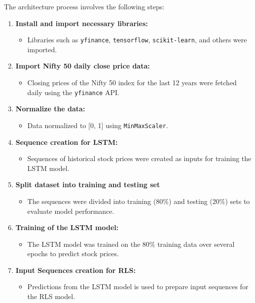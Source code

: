 The architecture process involves the following steps:

\begin{enumerate}
    \item \textbf{Install and import necessary libraries:}
    \begin{itemize}
        \item Libraries such as \texttt{yfinance}, \texttt{tensorflow}, \texttt{scikit-learn}, and others were imported.
    \end{itemize}
    
    \item \textbf{Import Nifty 50 daily close price data:}
    \begin{itemize}
        \item Closing prices of the Nifty 50 index for the last 12 years were fetched daily using the \texttt{yfinance} API.
    \end{itemize}
    
    \item \textbf{Normalize the data:}
    \begin{itemize}
        \item Data normalized to [0, 1] using \texttt{MinMaxScaler}.
    \end{itemize}
    
    \item \textbf{Sequence creation for LSTM:}
    \begin{itemize}
        \item Sequences of historical stock prices were created as inputs for training the LSTM model.
    \end{itemize}
    
    \item \textbf{Split dataset into training and testing set}
    \begin{itemize}
        \item The sequences were divided into training (80\%) and testing (20\%) sets to evaluate model performance.
    \end{itemize}
    
    \item \textbf{Training of the LSTM model:}
    \begin{itemize}
        \item The LSTM model was trained on the 80\% training data over several epochs to predict stock prices.
    \end{itemize}
    
    \item \textbf{Input Sequences creation for RLS:}
    \begin{itemize}
        \item Predictions from the LSTM model is used to prepare input sequences for the RLS model.
    \end{itemize}
    

\end{enumerate}
